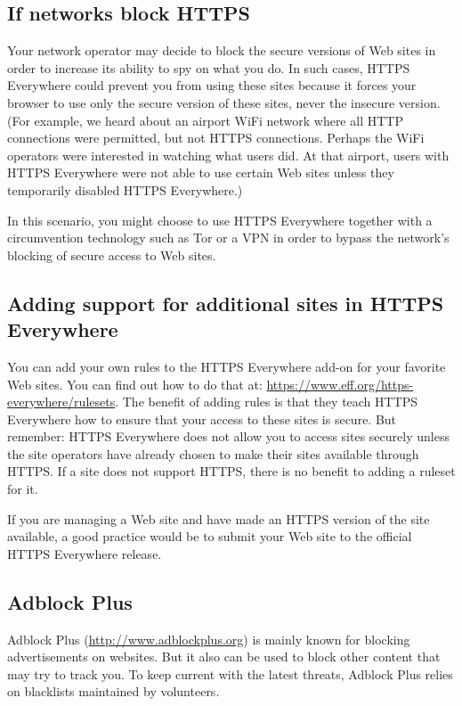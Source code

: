 \subsection{If networks block HTTPS}

Your network operator may decide to block the secure versions of Web
sites in order to increase its ability to spy on what you do. In such
cases, HTTPS Everywhere could prevent you from using these sites because
it forces your browser to use only the secure version of these sites,
never the insecure version. (For example, we heard about an airport WiFi
network where all HTTP connections were permitted, but not HTTPS
connections. Perhaps the WiFi operators were interested in watching what
users did. At that airport, users with HTTPS Everywhere were not able to
use certain Web sites unless they temporarily disabled HTTPS
Everywhere.)

In this scenario, you might choose to use HTTPS Everywhere together with
a circumvention technology such as Tor or a VPN in order to bypass the
network's blocking of secure access to Web sites.

\subsection{Adding support for additional sites in HTTPS Everywhere}

You can add your own rules to the HTTPS Everywhere add-on for your
favorite Web sites. You can find out how to do that at:
\href{https://www.eff.org/https-everywhere/rulesets}{https://www.eff.org/https-everywhere/rulesets}.
The benefit of adding rules is that they teach HTTPS Everywhere how to
ensure that your access to these sites is secure. But remember: HTTPS
Everywhere does not allow you to access sites securely unless the site
operators have already chosen to make their sites available through
HTTPS. If a site does not support HTTPS, there is no benefit to adding a
ruleset for it.

If you are managing a Web site and have made an HTTPS version of the
site available, a good practice would be to submit your Web site to the
official HTTPS Everywhere release.

\subsection{Adblock Plus}

Adblock Plus
(\href{http://www.adblockplus.org}{http://www.adblockplus.org}) is
mainly known for blocking advertisements on websites. But it also can be
used to block other content that may try to track you. To keep current
with the latest threats, Adblock Plus relies on blacklists maintained by
volunteers.

